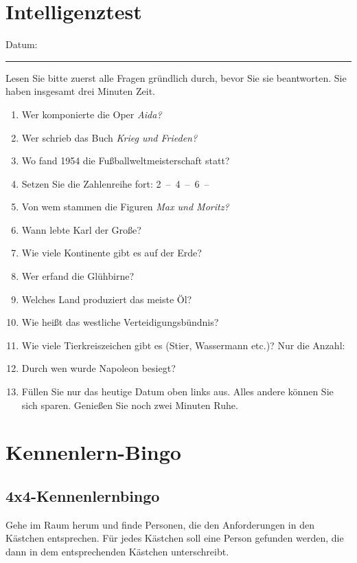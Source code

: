 \chapter{Intelligenztest}
\label{iq}
\medskip
Datum: \rule{3cm}{0,4pt}
\bigskip

Lesen Sie bitte zuerst alle Fragen gründlich durch, bevor Sie sie beantworten. Sie haben insgesamt drei Minuten Zeit.

\begin{enumerate}
\item Wer komponierte die Oper \emph{Aida?} \hrulefill
\item Wer schrieb das Buch \emph{Krieg und Frieden?} \hrulefill
\item Wo fand 1954 die Fußballweltmeisterschaft statt? \hrulefill
\item Setzen Sie die Zahlenreihe fort: 2~--~4~--~6~-- \hrulefill
\item Von wem stammen die Figuren \emph{Max und Moritz?} \hrulefill
\item Wann lebte Karl der Große? \hrulefill
\item Wie viele Kontinente gibt es auf der Erde? \hrulefill
\item Wer erfand die Glühbirne? \hrulefill
\item Welches Land produziert das meiste Öl? \hrulefill
\item Wie heißt das westliche Verteidigungsbündnis? \hrulefill
\item Wie viele Tierkreiszeichen gibt es (Stier, Wassermann etc.)? Nur die Anzahl: \hrulefill
\item Durch wen wurde Napoleon besiegt? \hrulefill
\item Füllen Sie nur das heutige Datum oben links aus. Alles andere können Sie sich sparen. Genießen Sie noch zwei Minuten Ruhe.
\end{enumerate}

\chapter{Kennenlern-Bingo}
\section*{4x4-Kennenlernbingo}
\label{bingo}
Gehe im Raum herum und finde Personen, die den Anforderungen in den Kästchen entsprechen. Für jedes Kästchen soll eine Person gefunden werden, die dann in dem entsprechenden Kästchen unterschreibt.

